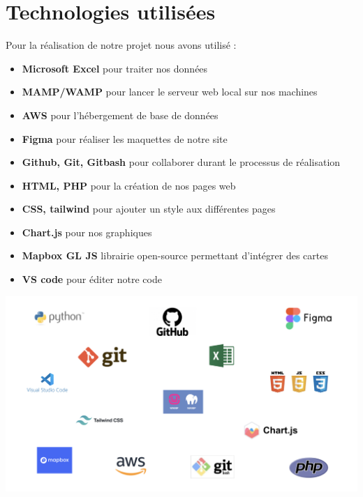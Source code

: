 \documentclass[12pt,a4paper]{report}
\begin{document}
\section{Technologies utilisées}
Pour la réalisation de notre projet nous avons utilisé :
\begin{itemize}
    \item \textbf{Microsoft Excel} pour traiter nos données
    \item \textbf{MAMP/WAMP} pour lancer le serveur web local sur nos machines
    \item \textbf{AWS} pour l'hébergement de base de données 
    \item \textbf{Figma} pour réaliser les maquettes de notre site
    \item \textbf{Github, Git, Gitbash} pour collaborer durant le processus de réalisation
    \item \textbf{HTML, PHP} pour la création de nos pages web
    \item \textbf{CSS, tailwind} pour ajouter un style aux différentes pages
    \item \textbf{Chart.js} pour nos graphiques
    \item \textbf{Mapbox GL JS} librairie open-source permettant d'intégrer des cartes 
    \item \textbf{VS code} pour éditer notre code
\end{itemize}
    \begin{center}
        \includegraphics[width=1\textwidth]{images/technologies.png}
    \end{center}
\end{document}
